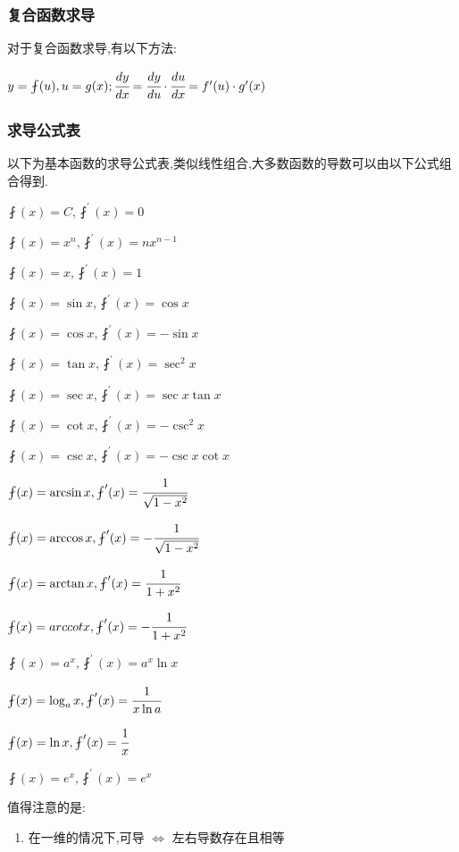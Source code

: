 \documentclass[UTF8,12pt]{ctexbook}
\newcommand{\derivative}{^\prime}
\begin{document}
{{{  \subsubsection{复合函数求导}{
    对于复合函数求导,有以下方法:

    $y = \fint(u), u = g(x); \cfrac{dy}{dx} = \cfrac{dy}{du} \cdot \cfrac{du}{dx} = f\derivative(u) \cdot g\derivative(x)$
  }%

  \subsubsection{求导公式表}{
    以下为基本函数的求导公式表,类似线性组合,大多数函数的导数可以由以下公式组合得到.

    $\fint(x) = C, \fint\derivative(x) = 0$

    $\fint(x) = x^n, \fint\derivative(x) = nx^{n-1}$

    $\fint(x) = x, \fint\derivative(x) = 1$

    $\fint(x) = \sin x, \fint\derivative(x) = \cos x$

    $\fint(x) = \cos x, \fint\derivative(x) = -\sin x$

    $\fint(x) = \tan x, \fint\derivative(x) = \sec^2 x$

    $\fint(x) = \sec x, \fint\derivative(x) = \sec x\tan x$

    $\fint(x) = \cot x, \fint\derivative(x) = -\csc^2 x$

    $\fint(x) = \csc x, \fint\derivative(x) = -\csc x\cot x$

    $\fint(x) = \arcsin x, \fint\derivative(x) = \cfrac{1}{\sqrt{1 - x^2}}$

    $\fint(x) = \arccos x, \fint\derivative(x) = -\cfrac{1}{\sqrt{1 - x^2}}$

    $\fint(x) = \arctan x, \fint\derivative(x) = \cfrac{1}{1 + x^2}$

    $\fint(x) = arccotx, \fint\derivative(x) = -\cfrac{1}{1 + x^2}$

    $\fint(x) = a^x, \fint\derivative(x) = a^x\ln x$

    $\fint(x) = \log_a x, \fint\derivative(x) = \cfrac{1}{x\ln a}$

    $\fint(x) = \ln x, \fint\derivative(x)= \cfrac{1}{x}$

    $\fint(x) = e^x, \fint\derivative(x) = e^x$
  }%
  \newline

  值得注意的是:
  \begin{enumerate}
    \item 在一维的情况下,可导 $\Leftrightarrow$ 左右导数存在且相等


\end{enumerate}}}}
\end{document}
